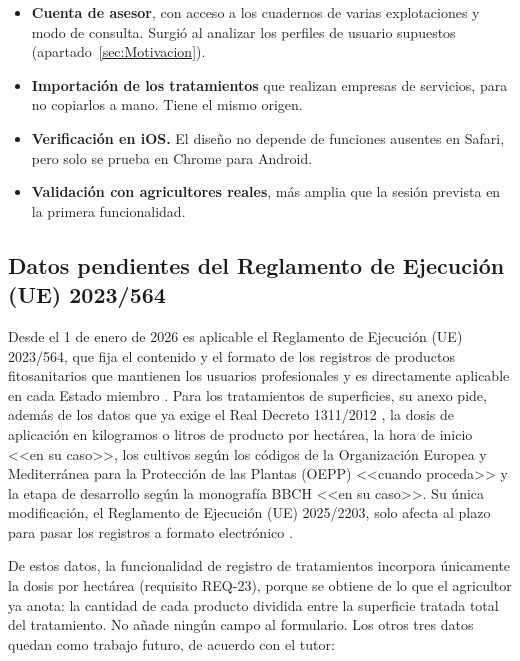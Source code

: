 \begin{itemize}
	\item \textbf{Cuenta de asesor}, con acceso a los cuadernos de varias explotaciones y modo de consulta. Surgió al analizar los perfiles de usuario supuestos (apartado~\ref{sec:Motivacion}).
	\item \textbf{Importación de los tratamientos} que realizan empresas de servicios, para no copiarlos a mano. Tiene el mismo origen.
	\item \textbf{Verificación en iOS.} El diseño no depende de funciones ausentes en Safari, pero solo se prueba en Chrome para Android.
	\item \textbf{Validación con agricultores reales}, más amplia que la sesión prevista en la primera funcionalidad. 
\end{itemize}

\subsection{Datos pendientes del Reglamento de Ejecución (UE) 2023/564}\label{subsec:PendientesReglamento2023564}
Desde el 1 de enero de 2026 es aplicable el Reglamento de Ejecución (UE) 2023/564, que fija el contenido y el formato de los registros de productos fitosanitarios que mantienen los usuarios profesionales y es directamente aplicable en cada Estado miembro \citep{reg2023-564}. Para los tratamientos de superficies, su anexo pide, además de los datos que ya exige el Real Decreto 1311/2012 \citep{rd1311-2012}, la dosis de aplicación en kilogramos o litros de producto por hectárea, la hora de inicio <<en su caso>>, los cultivos según los códigos de la Organización Europea y Mediterránea para la Protección de las Plantas (OEPP) <<cuando proceda>> y la etapa de desarrollo según la monografía BBCH <<en su caso>>. Su única modificación, el Reglamento de Ejecución (UE) 2025/2203, solo afecta al plazo para pasar los registros a formato electrónico \citep{reg2025-2203}.

De estos datos, la funcionalidad de registro de tratamientos incorpora únicamente la dosis por hectárea (requisito REQ-23), porque se obtiene de lo que el agricultor ya anota: la cantidad de cada producto dividida entre la superficie tratada total del tratamiento. No añade ningún campo al formulario. Los otros tres datos quedan como trabajo futuro, de acuerdo con el tutor:

